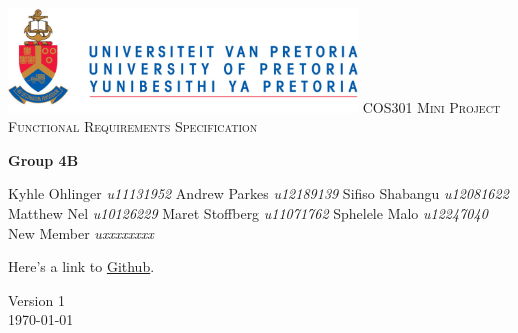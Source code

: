 \begin{titlepage}
\begin{center}
\includegraphics[width=350px]{University_of_Pretoria_Logo.png}\newline
\textsc{\LARGE COS301 Mini Project Functional Requirements Specification}\newline


\textbf{Group 4B} \\
\begin{flushright} \large
Kyhle Ohlinger \emph{u11131952} \newline
Andrew Parkes \emph{u12189139} \newline
Sifiso Shabangu \emph{u12081622} \newline
Matthew Nel \emph{u10126229} \newline
Maret Stoffberg \emph{u11071762} \newline
Sphelele Malo \emph{u12247040} \newline
New Member \emph{uxxxxxxxx} \newline \newline \newline
\end{flushright}
Here's a link to \href{https://github.com/KyhleOhlinger/COS301-Group-4_B.git}{Github}.


\vfill

{\large Version 1}
\\
{\large \today}

\end{center}
\end{titlepage}
